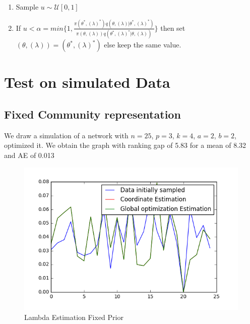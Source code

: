 \documentclass[12pt]{ociamthesis}  %
\begin{document}
\begin{enumerate}
\begin{enumerate}
	\item Sample $u \sim \mathcal{U}[0,1]$
	
	\item If $u < \alpha = min\{ 1, \frac{\pi(\theta^{*}, (\lambda)^{*})q(\theta, (\lambda) |\theta^{*}, (\lambda)^{*})}{\pi(\theta, (\lambda))q(\theta^{*}, (\lambda)^{*} |\theta, (\lambda))}   \}$ then set $(\theta, (\lambda)) = (\theta^{*}, (\lambda)^{*})$ else keep the same value.
	
	
	
	\end{enumerate}
	
\end{enumerate}
	
	\chapter{Test on simulated Data}
	
	\section{Fixed Community representation}
	
	We draw a simulation of a network with $n = 25$, $ p = 3$, $k = 4$, $a = 2$, $b = 2$, optimized it. We obtain the graph with ranking gap of 5.83 for a mean of 8.32 and AE of 0.013
		
	\begin{figure}
		\centering
		\includegraphics[width=\textwidth,height=\textheight,keepaspectratio]{LambdaEstimationFixedPrior}
		\caption{Lambda Estimation Fixed Prior}
		\label{label-image9}
	\end{figure}
	
\end{document}

